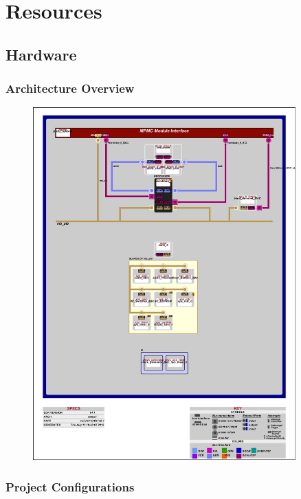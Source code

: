 \chapter{Resources}

\section{Hardware}

\subsection{Architecture Overview}
\label{sec:hw_arch}

\begin{figure}[H]
\centering
\includegraphics[width=0.9\textwidth]{images/system_blkd.jpg}
\end{figure}

\subsection{Project Configurations}


